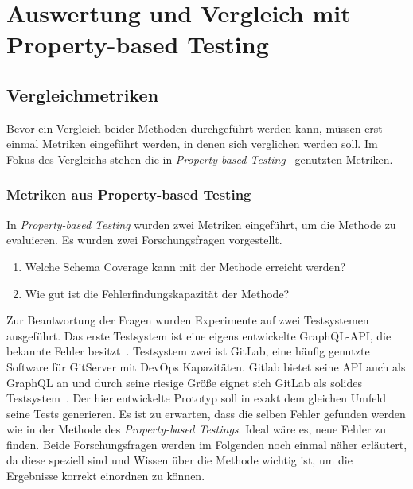 \chapter{Auswertung und Vergleich mit Property-based Testing}
\label{experimente}

\section{Vergleichmetriken}

Bevor ein Vergleich beider Methoden durchgeführt werden kann, müssen erst einmal Metriken eingeführt werden, in denen sich verglichen werden soll.
Im Fokus des Vergleichs stehen die in \textit{Property-based Testing}~\cite{property-based-testing} genutzten Metriken.

\subsection{Metriken aus Property-based Testing}

In \textit{Property-based Testing} wurden zwei Metriken eingeführt, um die Methode zu evaluieren.
Es wurden zwei Forschungsfragen vorgestellt.

\begin{enumerate}
    \item Welche Schema Coverage kann mit der Methode erreicht werden?~\cite[vgl. RQ1]{property-based-testing}
    \item Wie gut ist die Fehlerfindungskapazität der Methode?~\cite[vgl. RQ2]{property-based-testing}
\end{enumerate}

Zur Beantwortung der Fragen wurden Experimente auf zwei Testsystemen ausgeführt.
Das erste Testsystem ist eine eigens entwickelte GraphQL-API, die bekannte Fehler besitzt~\cite[vgl. A.1]{property-based-testing}.
Testsystem zwei ist GitLab, eine häufig genutzte Software für GitServer mit DevOps Kapazitäten.
Gitlab bietet seine API auch als GraphQL an und durch seine riesige Größe eignet sich GitLab als solides Testsystem~\cite[vgl. A2]{property-based-testing}.
Der hier entwickelte Prototyp soll in exakt dem gleichen Umfeld seine Tests generieren.
Es ist zu erwarten, dass die selben Fehler gefunden werden wie in der Methode des \textit{Property-based Testings}.
Ideal wäre es, neue Fehler zu finden.
Beide Forschungsfragen werden im Folgenden noch einmal näher erläutert, da diese speziell sind und Wissen über die Methode wichtig ist, um die Ergebnisse korrekt einordnen zu können.

